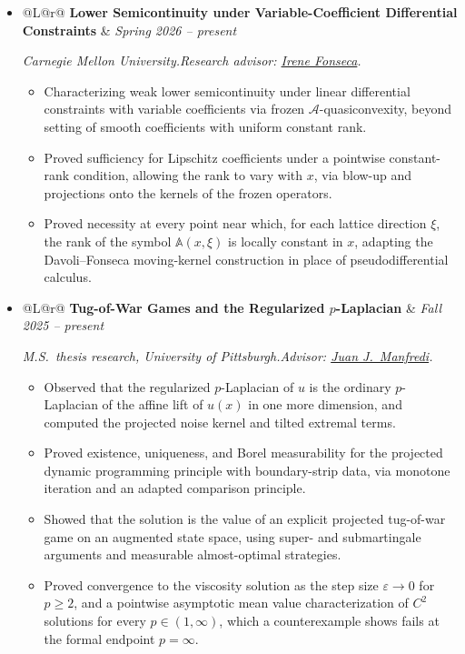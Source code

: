 \documentclass[11pt,letterpaper]{article}
\makeatletter
\newenvironment{cventries}[1][0pt]
  {\begin{itemize}[label={},leftmargin=#1,itemsep=0.65em,topsep=0.30em,
                   parsep=0pt,partopsep=0pt]}
  {\end{itemize}}
\newenvironment{cvbullets}
  {\begin{itemize}[label=\raisebox{0.20ex}{\scriptsize$\bullet$},
                   leftmargin=1.5em,itemsep=0.25em,topsep=0.18em,
                   parsep=0pt,partopsep=0pt]}
  {\end{itemize}}
\newcommand{\cvline}[2]{%
  \begin{tabularx}{\linewidth}{@{}L@{\hspace{1.5em}}r@{}}
    #1 & #2
  \end{tabularx}\par}
\newcommand{\factsep}{\hspace{0.6em}}
\newcommand{\roleentry}[3]{%
  \item \cvline{\textbf{#1}}{\textit{#2}}\nopagebreak
        \vspace{0.12em}\par{\small\sloppy\textit{#3}}\par\nopagebreak}
\newcommand{\A}{\mathcal{A}}
\makeatother
\begin{document}
\begin{cventries}
  \roleentry{Lower Semicontinuity under Variable-Coefficient Differential Constraints}
            {Spring 2026 -- present}
            {Carnegie Mellon University.\factsep Research advisor:
             \href{https://irenefonseca.weebly.com}{Irene Fonseca}.}
\begin{cvbullets}
  \item Characterizing weak lower semicontinuity under linear differential
    constraints with variable coefficients via frozen $\A$-quasiconvexity,
    beyond setting of smooth coefficients with uniform constant rank.
  \item Proved sufficiency for Lipschitz coefficients under a pointwise
    constant-rank condition, allowing the rank to vary with $x$, via blow-up
    and projections onto the kernels of the frozen operators.
  \item Proved necessity at every point near which, for each lattice direction
    $\xi$, the rank of the symbol $\mathbb{A}(x,\xi)$ is locally constant in $x$,
    adapting the Davoli--Fonseca moving-kernel construction in place of
    pseudodifferential calculus.
\end{cvbullets}

  \roleentry{Tug-of-War Games and the Regularized $p$-Laplacian}
            {Fall 2025 -- present}
            {M.S.\ thesis research, University of Pittsburgh.\factsep Advisor:
             \href{https://sites.pitt.edu/~manfredi/}{Juan J.\ Manfredi}.}
  \begin{cvbullets}
    \item Observed that the regularized $p$-Laplacian of $u$ is the ordinary
          $p$-Laplacian of the affine lift of $u(x)$ in one more dimension, and
          computed the projected noise kernel and tilted extremal terms.
    \item Proved existence, uniqueness, and Borel measurability for the
          projected dynamic programming principle with boundary-strip data,
          via monotone iteration and an adapted comparison principle.
    \item Showed that the solution is the value of an explicit projected
          tug-of-war game on an augmented state space, using super- and
          submartingale arguments and measurable almost-optimal strategies.
    \item Proved convergence to the viscosity solution as the step size
          $\varepsilon\to 0$ for $p\ge 2$, and a pointwise asymptotic mean value
          characterization of $C^2$ solutions for every $p\in(1,\infty)$, which a
          counterexample shows fails at the formal endpoint $p=\infty$.
  \end{cvbullets}
\end{cventries}
\end{document}
